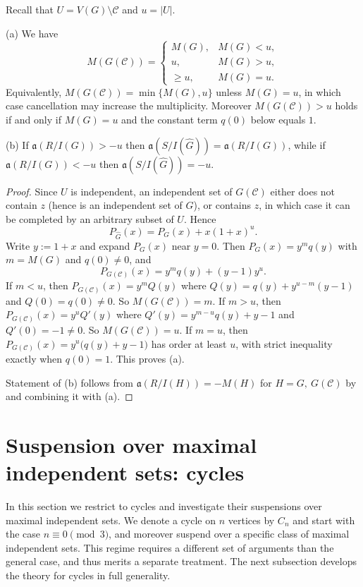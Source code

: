 \documentclass[12pt]{amsart}
\theoremstyle{plain}
\theoremstyle{definition}
\begin{document}
\begin{prop}\label{prop:ainv-min-vertex-cover}
Recall that $U=V(G)\setminus \mathcal C$ and $u=|U|$.

(a) We have
\[
M(G(\mathcal C))=
\begin{cases}
M(G), & M(G)<u,\\
u, & M(G)>u,\\
\ge u, & M(G)=u.
\end{cases}
\]
Equivalently, $M(G(\mathcal C))=\min\{M(G),u\}$ unless $M(G)=u$, in which case cancellation may increase
the multiplicity. Moreover $M(G(\mathcal C))>u$ holds if and only if $M(G)=u$ and the constant term $q(0)$
below equals $1$.

\smallskip
(b) If $\mathfrak{a}(R/I(G))>-u$ then $\mathfrak{a}(S/I(\widehat{G}))=\mathfrak{a}(R/I(G))$,
while if $\mathfrak{a}(R/I(G))<-u$ then $\mathfrak{a}(S/I(\widehat{G}))=-u$.
\end{prop}

\begin{proof}
Since $U$ is independent, an independent set of $G(\mathcal C)$ either does not contain $z$ (hence is an independent
set of $G$), or contains $z$, in which case it can be completed by an arbitrary subset of $U$. Hence
\[
P_{\widehat{G}}(x)=P_G(x)+x(1+x)^u.
\]
Write $y:=1+x$ and expand $P_G(x)$ near $y=0$. Then $P_G(x)=y^m q(y)$ with $m=M(G)$ and $q(0)\neq 0$, and 
\[
P_{G(\mathcal C)}(x)=y^{m}q(y)+(y-1)y^{u}.
\]
If $m<u$, then $P_{G(\mathcal C)}(x)=y^{m}Q(y)$ where $Q(y)=q(y)+y^{u-m}(y-1)$ and $Q(0)=q(0)\neq 0$. So $M(G(\mathcal C))=m$.
If $m>u$, then $P_{G(\mathcal C)}(x)=y^{u}Q'(y)$ where $Q'(y)=y^{m-u}q(y)+y-1$ and $Q'(0)=-1\neq 0$. So $M(G(\mathcal C))=u$.
If $m=u$, then $P_{G(\mathcal C)}(x)=y^{u}\bigl(q(y)+y-1\bigr)$ has order at least $u$, with strict inequality exactly when
$q(0)=1$. This proves (a).

Statement of (b) follows from  $\mathfrak{a}(R/I(H))=-M(H)$ for $H=G,~G(\mathcal C)$ by  and combining it with (a).
\end{proof}

\section{Suspension over maximal independent sets:  cycles}\label{sec:cycles}

In this section we restrict to cycles and investigate their suspensions over maximal independent sets. We denote a cycle on $n$ vertices by $C_n$ and start with the case $n\equiv 0 \pmod 3$, and moreover suspend over a specific class of maximal independent sets. This regime requires a different set of arguments than the general case, and thus merits a separate treatment. The next subsection develops the theory for cycles in full generality.
\end{document}
